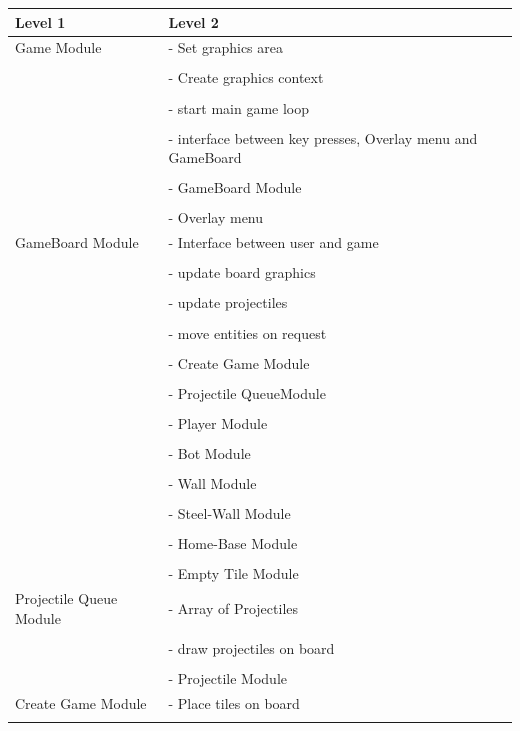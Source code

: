 \documentclass{article}
\begin{document}
\begin{tabularx}{\textwidth}{l X}

	Level 1 & Level 2\\
	\midrule
	Game Module & - Set graphics area\\ \\
	 & - Create graphics context\\ \\
	 & - start main game loop\\ \\
	 & - interface between key presses, Overlay menu and GameBoard\\ \\
	 & - GameBoard Module\\ \\
	 & - Overlay menu\\
	 \midrule
	 GameBoard Module & - Interface between user and game\\ \\
	 & - update board graphics\\ \\
	 & - update projectiles\\ \\
	 & - move entities on request\\ \\
	 & - Create Game Module \\ \\
	 & - Projectile  QueueModule \\ \\
	 & - Player Module\\ \\
	 & - Bot Module\\ \\
	 & - Wall Module\\ \\
	 & - Steel-Wall Module\\ \\
	 & - Home-Base Module\\ \\
	 & - Empty Tile Module\\
	  \midrule
	 Projectile  Queue Module & - Array of Projectiles \\ \\
	 & - draw projectiles on board\\ \\
	 & - Projectile Module\\
	  \midrule
	 Create Game Module & - Place tiles on board \\ \\

\end{tabularx}
\end{document}
